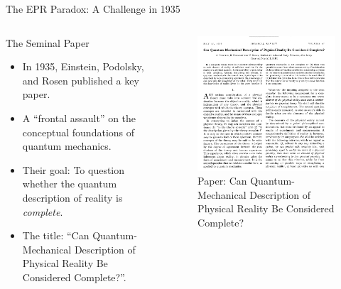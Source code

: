 \begin{frame}{The EPR Paradox: A Challenge in 1935}

  \begin{columns}
    \begin{column}{0.55\textwidth} %
      \begin{block}{The Seminal Paper}
        \begin{itemize}[<+->]
          \item In 1935, Einstein, Podolsky, and Rosen published a key paper.
          \item A ``frontal assault'' on the conceptual foundations of quantum mechanics.
          \item Their goal: To question whether the quantum description of reality is \emph{complete}.
          \item The title: ``Can Quantum-Mechanical Description of Physical Reality Be Considered Complete?''.
        \end{itemize}
      \end{block}
    \end{column}

    \begin{column}{0.45\textwidth} %
      \begin{center}
       \begin{figure}
        \centering
        \includegraphics[width=0.5\linewidth]{images/EPR-articulo.png}
        \caption{Paper: Can Quantum-Mechanical Description of Physical Reality Be Considered Complete? \cite{Einstein1935}}
      \end{figure}
      \end{center}
    \end{column}
  \end{columns}

\end{frame}

